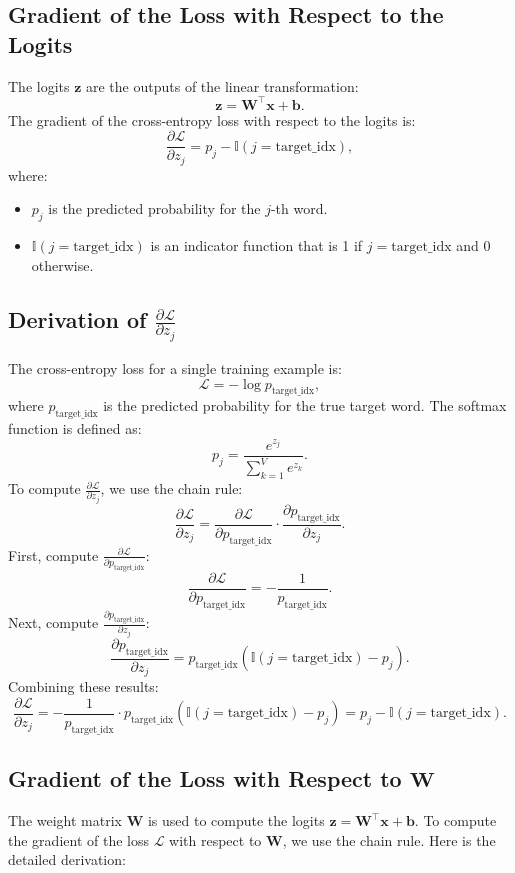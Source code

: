 \begin{notechapter}
\subsection{Gradient of the Loss with Respect to the Logits}
The logits \(\mathbf{z}\) are the outputs of the linear transformation:
\[
\mathbf{z} = \mathbf{W}^\top \mathbf{x} + \mathbf{b}.
\]
The gradient of the cross-entropy loss with respect to the logits is:
\[
\frac{\partial \mathcal{L}}{\partial z_j} = p_j - \mathbb{I}(j = \text{target\_idx}),
\]
where:
\begin{itemize}
    \item \( p_j \) is the predicted probability for the \( j \)-th word.
    \item \( \mathbb{I}(j = \text{target\_idx}) \) is an indicator function
          that is 1 if \( j = \text{target\_idx} \) and 0 otherwise.
\end{itemize}

\subsection{Derivation of \(\frac{\partial \mathcal{L}}{\partial z_j}\)}
The cross-entropy loss for a single training example is:
\[
\mathcal{L} = -\log p_{\text{target\_idx}},
\]
where \( p_{\text{target\_idx}} \) is the predicted probability for the true
target word. The softmax function is defined as:
\[
p_j = \frac{e^{z_j}}{\sum_{k=1}^V e^{z_k}}.
\]
To compute \(\frac{\partial \mathcal{L}}{\partial z_j}\), we use the chain rule:
\[
\frac{\partial \mathcal{L}}{\partial z_j} = 
\frac{\partial \mathcal{L}}{\partial p_{\text{target\_idx}}} 
\cdot \frac{\partial p_{\text{target\_idx}}}{\partial z_j}.
\]
First, compute \(\frac{\partial \mathcal{L}}{\partial p_{\text{target\_idx}}}\):
\[
\frac{\partial \mathcal{L}}{\partial p_{\text{target\_idx}}} = 
-\frac{1}{p_{\text{target\_idx}}}.
\]
Next, compute \(\frac{\partial p_{\text{target\_idx}}}{\partial z_j}\):
\[
\frac{\partial p_{\text{target\_idx}}}{\partial z_j} = 
p_{\text{target\_idx}} (\mathbb{I}(j = \text{target\_idx}) - p_j).
\]
Combining these results:
\[
\frac{\partial \mathcal{L}}{\partial z_j} = 
-\frac{1}{p_{\text{target\_idx}}} \cdot 
p_{\text{target\_idx}} (\mathbb{I}(j = \text{target\_idx}) - p_j) 
= p_j - \mathbb{I}(j = \text{target\_idx}).
\]

\subsection{Gradient of the Loss with Respect to \(\mathbf{W}\)}
The weight matrix \(\mathbf{W}\) is used to compute the logits
\(\mathbf{z} = \mathbf{W}^\top \mathbf{x} + \mathbf{b}\). To compute the
gradient of the loss \(\mathcal{L}\) with respect to \(\mathbf{W}\), we use
the chain rule. Here is the detailed derivation:


\end{notechapter}
